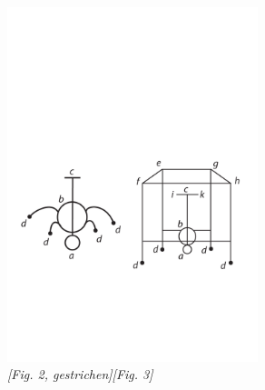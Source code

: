    \begin{figure}
   \includegraphics[width=0.65\textwidth]{images/35_15_6_48v1u2}\\
   \hspace{10mm} \textit{[Fig. 2, gestrichen]}\hspace{30mm}\textit{[Fig. 3]}
   \end{figure}
